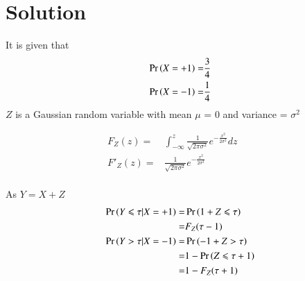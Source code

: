 \documentclass[journal,12pt,twocolumn]{IEEEtran}
\begin{document}
{\section{Solution}
It is given that
\begin{align}
    \Pr\left(X=+1\right)=&\frac{3}{4}
    \\\Pr\left(X=-1\right)=&\frac{1}{4}
\end{align}
 $Z$ is a Gaussian random variable with mean  $\mu$ = 0 and variance = $\sigma^2$


\begin{align}
    F_Z(z) =&  \int_{-\infty}^{z}{\frac{1}{\sqrt{2\pi\sigma^2}}e^{-\frac{x^2}{2\sigma^2}}dz}& &
    \\F'_Z(z) =& \frac{1}{\sqrt{2\pi\sigma^2}}e^{-\frac{x^2}{2\sigma^2}}& &
\end{align}
\\As $Y=X+Z$
\begin{align}
    \Pr\left(Y\leqslant \tau |X=+1\right)=&\Pr\left(1+Z\leqslant \tau \right)
    \\ =& F_Z(\tau-1)
    \label{eqn_1}
    \\ \Pr\left(Y>\tau|X=-1\right)=& \Pr\left(-1+Z>\tau\right)
    \\=& 1-\Pr\left(Z\leqslant\tau+1\right)
    \\=& 1- F_Z(\tau+1)
    \label{eqn_2}
\end{align}

}
\end{document}
